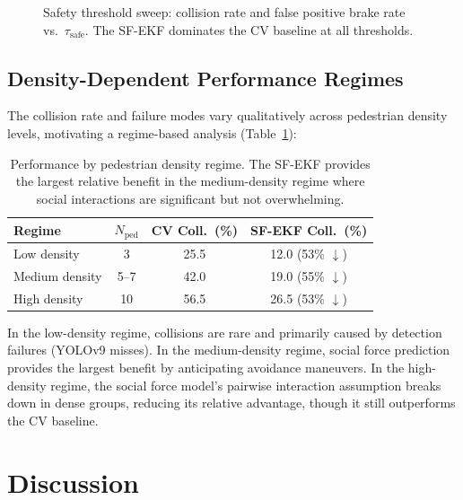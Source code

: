 \documentclass[conference]{IEEEtran}
\begin{document}
\begin{figure}[H]
    \centering
    
    \caption{Safety threshold sweep: collision rate and false positive brake rate vs.\ $\tau_{\text{safe}}$. The SF-EKF dominates the CV baseline at all thresholds.}
    \label{fig:roc_threshold}
\end{figure}

\subsection{Density-Dependent Performance Regimes}

The collision rate and failure modes vary qualitatively across pedestrian density levels, motivating a regime-based analysis (Table~\ref{tab:regimes}):

\begin{table}[!t]
    \centering
    \caption{Performance by pedestrian density regime. The SF-EKF provides the largest relative benefit in the medium-density regime where social interactions are significant but not overwhelming.}
    \label{tab:regimes}
    \renewcommand{\arraystretch}{1.15}
    \begin{tabular}{l c c c}
        \toprule
        \textbf{Regime} & \textbf{$N_{\text{ped}}$} & \textbf{CV Coll.\ (\%)} & \textbf{SF-EKF Coll.\ (\%)} \\
        \midrule
        Low density    & 3     & 25.5 & 12.0 (53\% $\downarrow$) \\
        Medium density & 5--7  & 42.0 & 19.0 (55\% $\downarrow$) \\
        High density   & 10    & 56.5 & 26.5 (53\% $\downarrow$) \\
        \bottomrule
    \end{tabular}
\end{table}

In the low-density regime, collisions are rare and primarily caused by detection failures (YOLOv9 misses).
In the medium-density regime, social force prediction provides the largest benefit by anticipating avoidance maneuvers.
In the high-density regime, the social force model's pairwise interaction assumption breaks down in dense groups, reducing its relative advantage, though it still outperforms the CV baseline.

\section{Discussion}
\label{sec:discussion}
\end{document}
